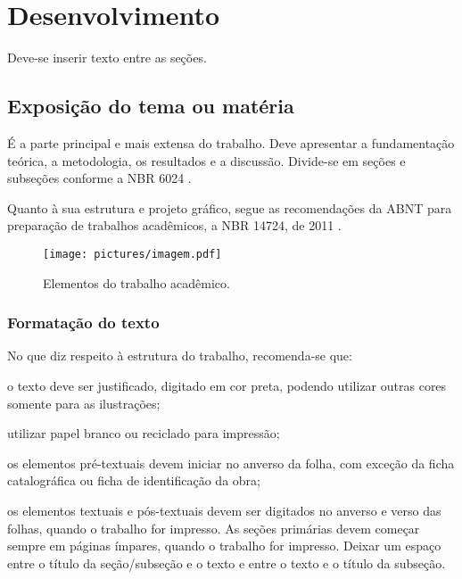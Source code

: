 \chapter{Desenvolvimento}\label{cap:desenvolvimento}
Deve-se inserir texto entre as seções.

\section{Exposição do tema ou matéria}

É a parte principal e mais extensa do trabalho. Deve apresentar a fundamentação teórica, a metodologia, os resultados e a discussão. Divide-se em seções e subseções conforme a NBR 6024 \cite{NBR6024:2012}.

Quanto à sua estrutura e projeto gráfico, segue as recomendações da \gls{ABNT} para preparação de trabalhos acadêmicos, a NBR 14724, de 2011 \cite{NBR14724:2011}.

\begin{figure}[htb]
	\caption{\label{fig:Fig_1}Elementos do trabalho acadêmico.}
	\begin{center}
		\texttt{[image: pictures/imagem.pdf]}
	\end{center}
\end{figure}

\subsection{Formatação do texto}

No que diz respeito à estrutura do trabalho, recomenda-se que:
\begin{alineas}
	\item o texto deve ser justificado, digitado em cor preta, podendo utilizar outras cores somente para as ilustrações;
	\item utilizar papel branco ou reciclado para impressão;
	\item os elementos pré-textuais devem iniciar no anverso da folha, com exceção da ficha catalográfica ou ficha de identificação da obra;
	\item os elementos textuais e pós-textuais devem ser digitados no anverso e verso das folhas, quando o trabalho for impresso. As seções primárias devem começar sempre em páginas ímpares, quando o trabalho for impresso. Deixar um espaço entre o título da seção/subseção e o texto e entre o texto e o título da subseção.
\end{alineas}

